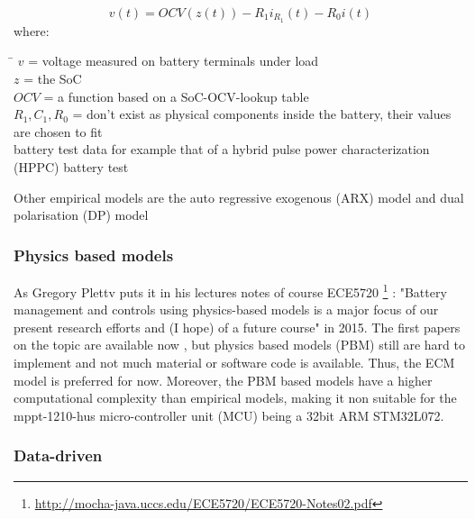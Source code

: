 \begin{equation}
{v}(t) = {OCV}(z(t)) - {R}_{1} {i}_{R_1}(t) - {R}_{0} i(t)
\end{equation}
where: 
\begin{tabbing}
\phantom{$v(t)  \  \ \ \ \ \ \ \ \ \ \ \ $}\= \kill
$v$\> =  voltage measured on battery terminals under load   \\
$z  $\> = the SoC  \\
$OCV $\>  = a function based on a SoC-OCV-lookup table \\
$R_1,C_1,R_0$\> = don't exist as physical components inside the battery, their values are chosen to fit  \\
battery test data for example that of a hybrid pulse power characterization (HPPC) battery test  \\ %

\end{tabbing}

Other empirical models are the auto regressive exogenous (ARX) model and dual polarisation (DP) model %

\subsubsection{Physics based models}

As Gregory Plettv puts it in his lectures notes of course ECE5720  \footnote{ \url{http://mocha-java.uccs.edu/ECE5720/ECE5720-Notes02.pdf}} :  "Battery management and controls using physics-based models is a major focus of our present research efforts and (I hope) of a future
course" in 2015. The first papers on the topic are available now \cite{9477587}, but physics based models (PBM) still are hard to implement and not much material or software code is available. Thus, the ECM model is preferred for now. Moreover, the PBM based models have a higher computational complexity than
empirical models, making it non suitable for the mppt-1210-hus micro-controller unit (MCU) being a 32bit ARM STM32L072. %


\subsubsection{Data-driven}


